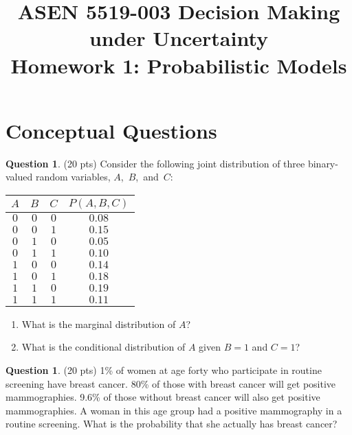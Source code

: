\documentclass{article}
\title{ASEN 5519-003 Decision Making under Uncertainty\\
       Homework 1: Probabilistic Models}
\theoremstyle{definition}
\newtheorem{question}[thm]{Question}
\begin{document}
\maketitle

\section{Conceptual Questions}

\begin{question} (20 pts)
    Consider the following joint distribution of three binary-valued random variables, \mbox{$A$, $B$, and $C$}:

    \begin{minipage}{0.23\linewidth}
        \vspace{1em}
    {\tiny
    \begin{tabular}{cccc}
        \toprule
            $A$ & $B$ & $C$ & $P(A,B,C)$ \\
        \midrule
            $0$ & $0$ & $0$ & $0.08$ \\
            $0$ & $0$ & $1$ & $0.15$ \\
            $0$ & $1$ & $0$ & $0.05$ \\
            $0$ & $1$ & $1$ & $0.10$ \\
            $1$ & $0$ & $0$ & $0.14$ \\
            $1$ & $0$ & $1$ & $0.18$ \\
            $1$ & $1$ & $0$ & $0.19$ \\
            $1$ & $1$ & $1$ & $0.11$ \\
        \bottomrule
    \end{tabular}
    }
    \end{minipage}
    \begin{minipage}{0.75\linewidth}
        \begin{enumerate}[label=\alph*)]
            \item What is the marginal distribution of $A$?
            \item What is the conditional distribution of $A$ given $B=1$ and $C=1$?
        \end{enumerate}
    \end{minipage}
\end{question}

\begin{question} (20 pts)
    1\% of women at age forty who participate in routine screening have breast cancer. 80\% of those with breast cancer will get positive mammographies. 9.6\% of those without breast cancer will also get positive mammographies. A woman in this age group had a positive mammography in a routine screening. What is the probability that she actually has breast cancer?
\end{question}
\end{document}
